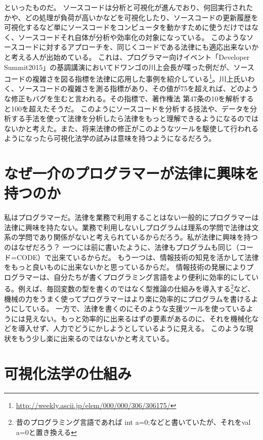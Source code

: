 \documentclass[a5j,openany,twoside]{jsbook}
\begin{document}
といったものだ。
ソースコードは分析と可視化が進んでおり、何回実行されたかや、どの処理が負荷が高いかなどを可視化したり、ソースコードの更新履歴を可視化するなど単にソースコードをコンピュータを動かすために使うだけではなく、ソースコードそれ自体が分析や効率化の対象になっている。
このようなソースコードに対するアプローチを、同じくコードである法律にも適応出来ないかと考える人が出始めている。
これは、プログラマー向けイベント「Developer Summit2015」の基調講演においてドワンゴの川上会長が喋った例だが、ソースコードの複雑さを図る指標を法律に応用した事例を紹介している\footnote{\url{http://weekly.ascii.jp/elem/000/000/306/306175/}}。川上氏いわく、ソースコードの複雑さを測る指標があり、その値が75を超えれば、どのような修正もバグを生むと言われる。その指標で、著作権法 第47条の10を解析すると100を超えたそうだ。
このようにソースコードを分析する技法や、データを分析する手法を使って法律を分析したら法律をもっと理解できるようになるのではないかと考えた。また、将来法律の修正がこのようなツールを駆使して行われるようになったら可視化法学の試みは意味を持つようになるだろう。

\section{なぜ一介のプログラマーが法律に興味を持つのか}

私はプログラマーだ。法律を業務で利用することはない一般的にプログラマーは法律に興味を持たない。業務で利用しないしプログラムは理系の学問で法律は文系の学問であり関係がないと考えられているからだろう。私が法律に興味を持つのはなぜだろう？
一つには前に書いたように、法律もプログラムも同じ（コード=CODE）で出来ているからだ。
もう一つは、情報技術の知見を活かして法律をもっと良いものに出来ないかと思っているからだ。
情報技術の発展によりプログラマーは、自分たちが書くプログラミング言語をより便利に効率的にしている。例えば、毎回変数の型を書くのではなく型推論の仕組みを導入する\footnote{昔のプログラミング言語であれば int a=0;などと書いていたが、それをval a=0と置き換える}など、機械の力をうまく使ってプログラマーはより楽に効率的にプログラムを書けるようにしている。
一方で、法律を書くのにそのような支援ツールを使っているようには見えない。もっと効率的に出来るはずの要素があるのに、それを機械化などを導入せず、人力でどうにかしようとしているように見える。
このような現状をもう少し楽に出来るのではないかと考えている。

\section{可視化法学の仕組み}
\end{document}
